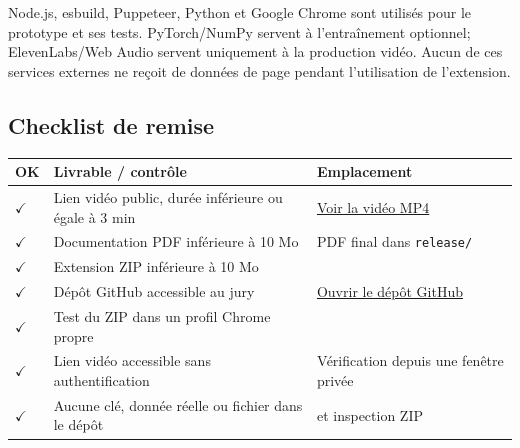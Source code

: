 \begin{evidencebox}
Node.js, esbuild, Puppeteer, Python et Google Chrome sont utilisés pour le
prototype et ses tests. PyTorch/NumPy servent à l’entraînement optionnel;
ElevenLabs/Web Audio servent uniquement à la production vidéo. Aucun de ces
services externes ne reçoit de données de page pendant l’utilisation de
l’extension.
\end{evidencebox}

\subsection{Checklist de remise}

\begin{tabularx}{\linewidth}{@{}|C{9mm}|Y|L{53mm}|@{}}
\hline
\textbf{OK} & \textbf{Livrable / contrôle} & \textbf{Emplacement}\\
\hline
\(\checkmark\) & Lien vidéo public, durée inférieure ou égale à 3 min &
\href{\DemoVideoURL}{Voir la vidéo MP4}\\
\hline
\(\checkmark\) & Documentation PDF inférieure à 10 Mo &
PDF final dans \texttt{release/}\\
\hline
\(\checkmark\) & Extension ZIP inférieure à 10 Mo &
\\
\hline
\(\checkmark\) & Dépôt GitHub accessible au jury &
\href{\RepoURL}{Ouvrir le dépôt GitHub}\\
\hline
\(\checkmark\) & Test du ZIP dans un profil Chrome propre &
\\
\hline
\(\checkmark\) & Lien vidéo accessible sans authentification &
Vérification depuis une fenêtre privée\\
\hline
\(\checkmark\) & Aucune clé, donnée réelle ou fichier  dans le dépôt &
 et inspection ZIP\\
\hline
\end{tabularx}

